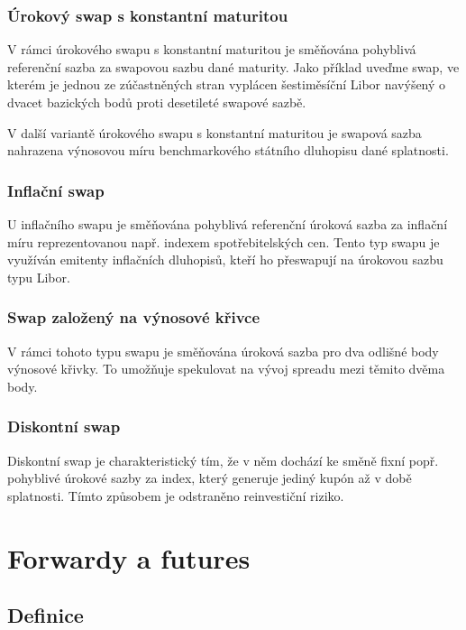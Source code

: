 \documentclass[a4paper]{book}
\begin{document}
\subsection{Úrokový swap s konstantní maturitou}

V rámci úrokového swapu s konstantní maturitou je směňována pohyblivá referenční sazba za swapovou sazbu dané maturity. Jako příklad uveďme swap, ve kterém je jednou ze zúčastněných stran vyplácen šestiměsíční Libor navýšený o dvacet bazických bodů proti desetileté swapové sazbě.

V další variantě úrokového swapu s konstantní maturitou je swapová sazba nahrazena výnosovou míru benchmarkového státního dluhopisu dané splatnosti.

\subsection{Inflační swap}

U inflačního swapu je směňována pohyblivá referenční úroková sazba za inflační míru reprezentovanou např. indexem spotřebitelských cen. Tento typ swapu je využíván emitenty inflačních dluhopisů, kteří ho přeswapují na úrokovou sazbu typu Libor.

\subsection{Swap založený na výnosové křivce}

V rámci tohoto typu swapu je směňována úroková sazba pro dva odlišné body výnosové křivky. To umožňuje spekulovat na vývoj spreadu mezi těmito dvěma body.

\subsection{Diskontní swap}

Diskontní swap je charakteristický tím, že v něm dochází ke směně fixní popř. pohyblivé úrokové sazby za index, který generuje jediný kupón až v době splatnosti. Tímto způsobem je odstraněno reinvestiční riziko.

\chapter{Forwardy a futures}

\section{Definice}
\end{document}
